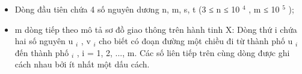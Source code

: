 \begin{itemize}
	\item Dòng đầu tiên chứa 4 số nguyên dương n, m, s, t (3 ≤ n ≤ 10 $^ 4 $ , m ≤ 10 $^ 5 $ );
	\item m dòng tiếp theo mô tả sơ đồ giao thông trên hành tinh X: Dòng thứ i chứa hai số nguyên u $_ i $ , v $_ i $ cho biết có đoạn đường một chiều đi từ thành phố u $_ i $ đến thành phố $_ i $ , i = 1, 2, ..., m. Các số liên tiếp trên cùng dòng được ghi cách nhau bởi ít nhất một dấu cách.
\end{itemize}
